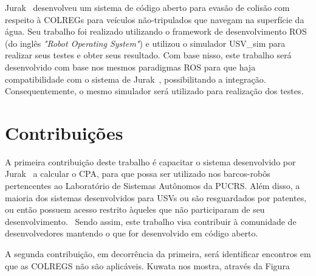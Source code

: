         Jurak~\cite{JURAK2020} desenvolveu um sistema de código aberto para evasão de colisão com respeito à COLREGs para veículos não-tripulados que navegam na superfície da água. Seu trabalho foi realizado utilizando o framework de desenvolvimento ROS (do inglês \textit{"Robot Operating System"}) e utilizou o simulador USV\_sim para realizar seus testes e obter seus resultado. Com base nisso, este trabalho será desenvolvido com base nos mesmos paradigmas ROS para que haja compatibilidade com o sistema de Jurak~\cite{JURAK2020}, possibilitando a integração. Consequentemente, o mesmo simulador será utilizado para realização dos testes.
        
    \section{Contribuições}\label{subchap1:contrib}
        A primeira contribuição deste trabalho é capacitar o sistema desenvolvido por Jurak~\cite{JURAK2020} a calcular o CPA, para que possa ser utilizado nos barcos-robôs pertencentes ao Laboratório de Sistemas Autônomos da PUCRS. Além disso, a maioria dos sistemas desenvolvidos para USVs ou são resguardados por patentes, ou então possuem acesso restrito àqueles que não participaram de seu desenvolvimento.~\cite{JURAK2020} Sendo assim, este trabalho visa contribuir à comunidade de desenvolvedores mantendo o que for desenvolvido em código aberto.
        
        A segunda contribuição, em decorrência da primeira, será identificar encontros em que as COLREGS não são aplicáveis. Kuwata \etal nos mostra, através da Figura
        
        
